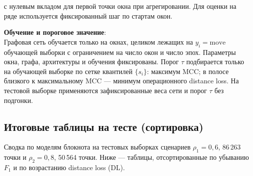 \documentclass[a4paper,12pt]{report}
\begin{document}
	с нулевым вкладом для первой точки окна при агрегировании. Для оценки на ряде используется фиксированный шаг по стартам окон.

	\textbf{Обучение и пороговое значение}:\\
	Графовая сеть обучается только на окнах, целиком лежащих на $y_i=\mathrm{move}$ обучающей выборки с ограничением на число окон и число эпох. Параметры окна, графа, архитектуры и обучения фиксированы. Порог $\tau$ подбирается только на обучающей выборке по сетке квантилей $\{s_i\}$: максимум MCC; в полосе близкого к максимальному MCC --- минимум операционного distance loss. На тестовой выборке применяются зафиксированные веса сети и порог $\tau$ без подгонки.

\subsection{Итоговые таблицы на тесте (сортировка)}
Сводка по моделям блокнота на тестовых выборках сценариев $\rho_1=0{,}6$, 86\,263 точки и $\rho_2=0{,}8$, 50\,564 точки. Ниже --- таблицы, отсортированные по убыванию $F_1$ и по возрастанию distance loss (DL).
\end{document}
